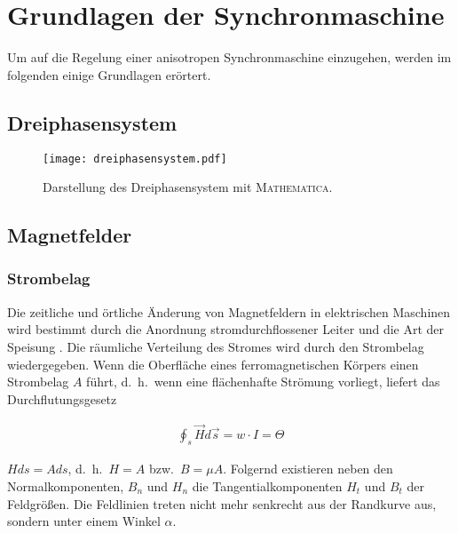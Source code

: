 
\chapter{Grundlagen der Synchronmaschine}\label{cha:grundlagen}

Um auf die Regelung einer anisotropen Synchronmaschine einzugehen, werden im folgenden einige Grundlagen erörtert.

\section{Dreiphasensystem}\label{sec:dreiphasensystem}

\begin{figure}[h]
\centering
\texttt{[image: dreiphasensystem.pdf]}
\label{fig:dreiphasensystem}
\caption{Darstellung des Dreiphasensystem mit \textsc{Mathematica}.}
\end{figure}

\section{Magnetfelder}\label{sec:magnetfelder}

\subsection{Strombelag}\label{sec:strombelag}

Die zeitliche und örtliche Änderung von Magnetfeldern in elektrischen Maschinen wird bestimmt durch die Anordnung stromdurchflossener Leiter und die Art der Speisung \parencite[S.~199]{hofmann2013}.
Die räumliche Verteilung des Stromes wird durch den Strombelag wiedergegeben.
Wenn die Oberfläche eines ferromagnetischen Körpers einen Strombelag $A$ führt, d.\ h.\ wenn eine flächenhafte Strömung vorliegt, liefert das Durchflutungsgesetz

\begin{align}
\oint_{s}{\vec{H}d\vec{s}} = w\cdot I = \Theta \label{durchflutungsgesetz}
\end{align}

$Hds=Ads$, d.\ h.\ $H = A$ bzw.\ $B = \mu A$.
Folgernd existieren neben den Normalkomponenten, $B_n$ und $H_n$ die Tangentialkomponenten $H_t$ und $B_t$ der Feldgrößen.
Die Feldlinien treten nicht mehr senkrecht aus der Randkurve aus, sondern unter einem Winkel $\alpha$.

